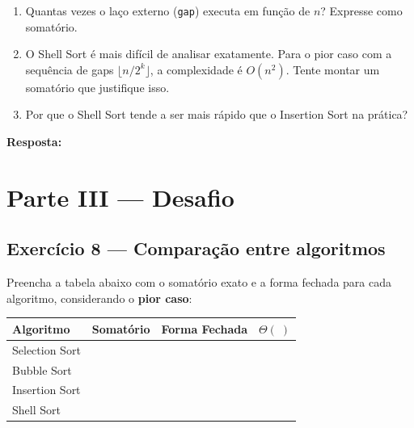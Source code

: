 \documentclass[12pt, a4paper]{article}
\newenvironment{resposta}{%
    \begin{mdframed}[linecolor=black!30, backgroundcolor=white,
                     innertopmargin=10pt, innerbottommargin=30pt,
                     skipabove=6pt]
    \textbf{Resposta:}\\[4pt]
}{%
    \end{mdframed}
}
\begin{document}
\begin{enumerate}[label=(\alph*)]
    \item Quantas vezes o laço externo (\texttt{gap}) executa em função de $n$? Expresse como somatório.
    \item O Shell Sort é mais difícil de analisar exatamente. Para o pior caso com a sequência de gaps $\lfloor n/2^k \rfloor$, a complexidade é $O(n^2)$. Tente montar um somatório que justifique isso.
    \item Por que o Shell Sort tende a ser mais rápido que o Insertion Sort na prática?
\end{enumerate}

\begin{resposta}
\vspace{4cm}
\end{resposta}

\section*{Parte III — Desafio}

\subsection*{Exercício 8 — Comparação entre algoritmos}

Preencha a tabela abaixo com o somatório exato e a forma fechada para cada algoritmo, considerando o \textbf{pior caso}:

\bigskip

\begin{center}
\renewcommand{\arraystretch}{2.5}
\begin{tabular}{|l|c|c|c|}
\hline
\textbf{Algoritmo} & \textbf{Somatório} & \textbf{Forma Fechada} & $\Theta(\;)$ \\
\hline
Selection Sort & & & \\
\hline
Bubble Sort    & & & \\
\hline
Insertion Sort & & & \\
\hline
Shell Sort     & & & \\
\hline
\end{tabular}
\end{center}

\bigskip

\end{document}
